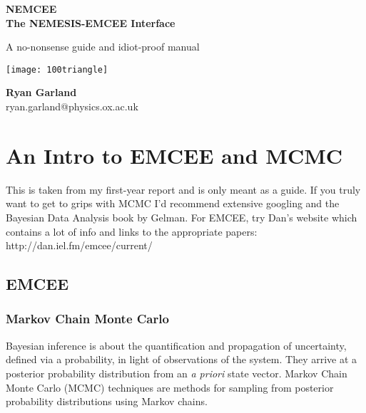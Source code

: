 \documentclass[11pt, a4paper,titlepage]{report}
\begin{document}
\begin{titlepage}
    \begin{center}
        
        \huge
        \textbf{NEMCEE  \\ The NEMESIS-EMCEE Interface}
        
        \vspace{0.5cm}
        \Large
        A no-nonsense guide and idiot-proof manual \\
        \vspace{1.0cm}
        
        \texttt{[image: 100triangle]}
        
        \vspace{1.5cm}        
	\LARGE
        \textbf{Ryan Garland} \\
          \Large
          ryan.garland@physics.ox.ac.uk
        
    \end{center}
\end{titlepage}

\tableofcontents

\newpage

\chapter{An Intro to EMCEE and MCMC}

This is taken from my first-year report and is only meant as a guide. If you truly want to get to grips with MCMC I'd recommend extensive googling and the Bayesian Data Analysis book by Gelman. For EMCEE, try Dan's website which contains a lot of info and links to the appropriate papers: http://dan.iel.fm/emcee/current/

\section{EMCEE}\label{section:emcee}

\subsection{Markov Chain Monte Carlo}

Bayesian inference is about the quantification and propagation of uncertainty, defined via a probability, in light of observations of the system. They arrive at a posterior probability distribution from an \textit{a priori} state vector. Markov Chain Monte Carlo (MCMC) techniques are methods for sampling from posterior probability distributions using Markov chains. 
\end{document}
